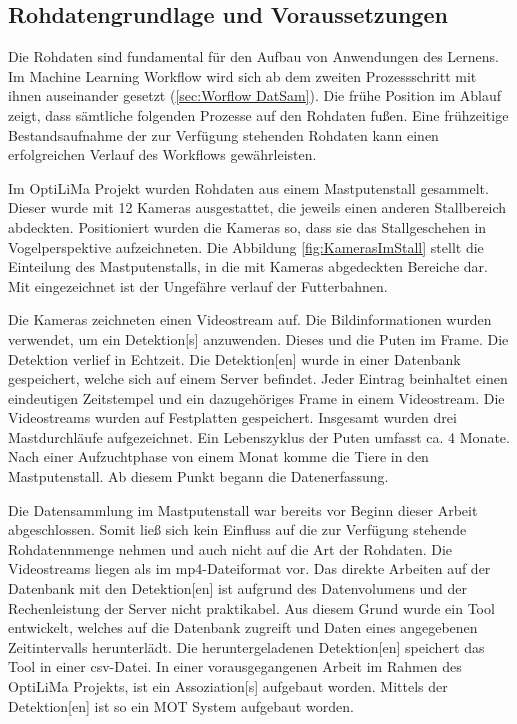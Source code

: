 \subsection{Rohdatengrundlage und Voraussetzungen} \label{sec:Meth RohDat}
Die Rohdaten sind fundamental für den Aufbau von Anwendungen des  Lernens. Im \gls{Machine Learning Workflow} wird sich ab dem zweiten Prozessschritt mit ihnen auseinander gesetzt (\ref{sec:Worflow DatSam}). Die frühe Position im Ablauf zeigt, dass sämtliche folgenden Prozesse auf den Rohdaten fußen. Eine frühzeitige Bestandsaufnahme der zur Verfügung stehenden Rohdaten kann einen erfolgreichen Verlauf des Workflows gewährleisten. \par

Im \acrshort{OptiLiMa} Projekt wurden Rohdaten aus einem Mastputenstall gesammelt. Dieser wurde mit 12 Kameras ausgestattet, die jeweils einen anderen Stallbereich abdeckten. Positioniert wurden die Kameras so, dass sie das Stallgeschehen in Vogelperspektive aufzeichneten. Die Abbildung \ref{fig:KamerasImStall} stellt die Einteilung des Mastputenstalls, in die mit Kameras abgedeckten Bereiche dar. Mit eingezeichnet ist der Ungefähre verlauf der Futterbahnen.


Die Kameras zeichneten einen Videostream auf. Die Bildinformationen wurden verwendet, um ein \gls{Detektion}[s] anzuwenden. Dieses  und  die Puten im \gls{Frame}. Die \gls{Detektion} verlief in Echtzeit. Die \gls{Detektion}[en] wurde in einer Datenbank gespeichert, welche sich auf einem Server befindet. Jeder Eintrag beinhaltet einen eindeutigen Zeitstempel und ein dazugehöriges \gls{Frame} in einem Videostream. Die Videostreams wurden auf Festplatten gespeichert. Insgesamt wurden  drei Mastdurchläufe aufgezeichnet. Ein Lebenszyklus der Puten umfasst ca. 4 Monate. Nach einer Aufzuchtphase von einem Monat komme die Tiere in den Mastputenstall. Ab diesem Punkt begann die Datenerfassung. \par

Die Datensammlung im Mastputenstall war bereits vor Beginn dieser Arbeit abgeschlossen. Somit ließ sich kein Einfluss auf die zur Verfügung stehende Rohdatennmenge nehmen und auch nicht auf die Art der Rohdaten. Die Videostreams liegen als im mp4-Dateiformat vor. Das direkte Arbeiten auf der Datenbank mit den \gls{Detektion}[en] ist aufgrund des Datenvolumens und der Rechenleistung der Server nicht praktikabel. Aus diesem Grund wurde ein Tool entwickelt, welches auf die Datenbank zugreift und Daten eines angegebenen Zeitintervalls herunterlädt. Die heruntergeladenen \gls{Detektion}[en] speichert das Tool in einer csv-Datei. In einer vorausgegangenen Arbeit im Rahmen des \acrshort{OptiLiMa} Projekts, ist ein \gls{Assoziation}[s] aufgebaut worden. Mittels der \gls{Detektion}[en] ist so ein \gls{MOT} System aufgebaut worden. \par

